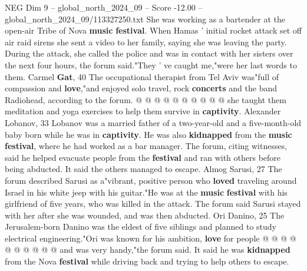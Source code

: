 \begin{textsample}{NEG Dim 9 – global\_north\_2024\_09 – Score -12.00 – global\_north\_2024\_09/113327250.txt}
She was working as a bartender at the open-air Tribe of Nova \textbf{music} \textbf{festival}.
When Hamas ' initial rocket attack set off air raid sirens she sent a video to her family, saying she was leaving the party.
During the attack, she called the police and was in contact with her sisters over the next four hours, the forum said."They ' ve caught me,"were her last words to them.
Carmel \textbf{Gat}, 40 The occupational therapist from Tel Aviv was"full of compassion and \textbf{love},"and enjoyed solo travel, rock \textbf{concerts} and the band Radiohead, according to the forum. @ @ @ @ @ @ @ @ @ @ she taught them meditation and yoga exercises to help them survive in \textbf{captivity}.
Alexander Lobanov, 33 Lobanov was a married father of a two-year-old and a five-month-old baby born while he was in \textbf{captivity}.
He was also \textbf{kidnapped} from the \textbf{music} \textbf{festival}, where he had worked as a bar manager.
The forum, citing witnesses, said he helped evacuate people from the \textbf{festival} and ran with others before being abducted.
It said the others managed to escape.
Almog Sarusi, 27 The forum described Sarusi as a"vibrant, positive person who \textbf{loved} traveling around Israel in his white jeep with his guitar."He was at the \textbf{music} \textbf{festival} with his girlfriend of five years, who was killed in the attack.
The forum said Sarusi stayed with her after she was wounded, and was then abducted.
Ori Danino, 25 The Jerusalem-born Danino was the eldest of five siblings and planned to study electrical engineering."Ori was known for his ambition, \textbf{love} for people @ @ @ @ @ @ @ @ @ @ and was very handy,"the forum said.
It said he was \textbf{kidnapped} from the Nova \textbf{festival} while driving back and trying to help others to escape.

\end{textsample}
